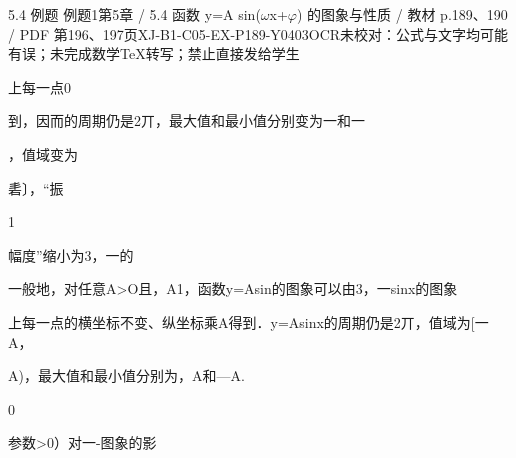 \begin{bankitem}{5.4 例题 例题1}{第5章 / 5.4 函数 y=A sin(\ensuremath{\omega}x+\ensuremath{\varphi}) 的图象与性质 / 教材 p.189、190 / PDF 第196、197页}{XJ-B1-C05-EX-P189-Y0403}{OCR未校对：公式与文字均可能有误；未完成数学TeX转写；禁止直接发给学生}
\begin{ocrdraft}
\par
上每一点0
\par
到，因而的周期仍是2丌，最大值和最小值分别变为一和一
\par
，值域变为
\par
砉〕，“振
\par
1
\par
幅度”缩小为3，一的
\par
一般地，对任意A>O且，A1，函数y=Asin的图象可以由3，一sinx的图象
\par
上每一点的横坐标不变、纵坐标乘A得到．y=Asinx的周期仍是2丌，值域为[一A，
\par
[教材p.190 / PDF第197页]
\par
A)，最大值和最小值分别为，A和—A.
\par
0
\par
参数>0）对一-图象的影
\end{ocrdraft}
\end{bankitem}

